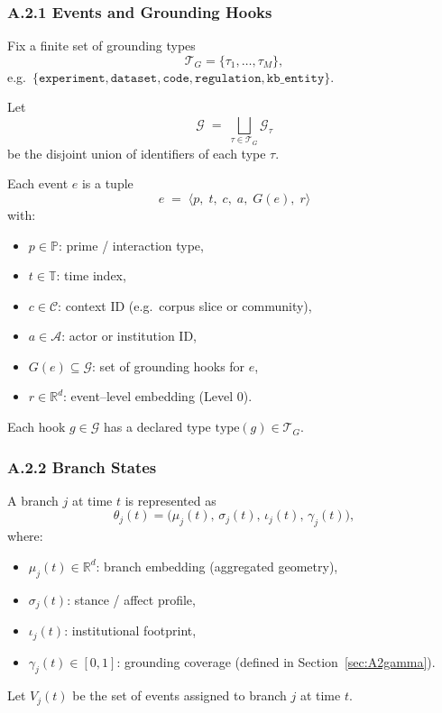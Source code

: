 \documentclass[11pt, a4paper]{article}
\begin{document}
\subsubsection*{A.2.1 \quad Events and Grounding Hooks}

Fix a finite set of grounding types
\[
\mathcal{T}_G = \{\tau_1,\dots,\tau_M\},
\]
e.g.\ $\{\texttt{experiment}, \texttt{dataset}, \texttt{code}, \texttt{regulation}, \texttt{kb\_entity}\}$.

Let
\[
\mathcal{G} \;=\; \bigsqcup_{\tau \in \mathcal{T}_G} \mathcal{G}_\tau
\]
be the disjoint union of identifiers of each type $\tau$.

Each event $e$ is a tuple
\[
e \;=\; \langle p,\; t,\; c,\; a,\; G(e),\; r \rangle
\]
with:
\begin{itemize}
  \item $p \in \mathbb{P}$: prime / interaction type,
  \item $t \in \mathbb{T}$: time index,
  \item $c \in \mathcal{C}$: context ID (e.g.\ corpus slice or community),
  \item $a \in \mathcal{A}$: actor or institution ID,
  \item $G(e) \subseteq \mathcal{G}$: set of grounding hooks for $e$,
  \item $r \in \mathbb{R}^d$: event–level embedding (Level 0).
\end{itemize}
Each hook $g \in \mathcal{G}$ has a declared type $\mathrm{type}(g) \in \mathcal{T}_G$.

\subsubsection*{A.2.2 \quad Branch States}

A branch $j$ at time $t$ is represented as
\[
\theta_j(t) = \bigl(\mu_j(t),\, \sigma_j(t),\, \iota_j(t),\, \gamma_j(t)\bigr),
\]
where:
\begin{itemize}
  \item $\mu_j(t) \in \mathbb{R}^d$: branch embedding (aggregated geometry),
  \item $\sigma_j(t)$: stance / affect profile,
  \item $\iota_j(t)$: institutional footprint,
  \item $\gamma_j(t) \in [0,1]$: grounding coverage (defined in Section~\ref{sec:A2gamma}).
\end{itemize}
Let $V_j(t)$ be the set of events assigned to branch $j$ at time $t$.
\end{document}
